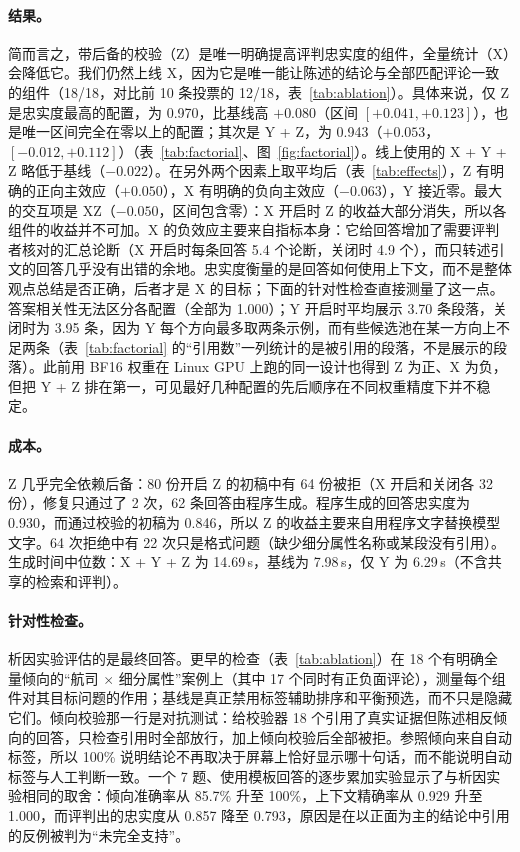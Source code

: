 \documentclass[10pt,twocolumn,a4paper]{article}
\begin{document}
\paragraph{结果。}简而言之，带后备的校验（Z）是唯一明确提高评判忠实度的组件，全量统计（X）会降低它。我们仍然上线 X，因为它是唯一能让陈述的结论与全部匹配评论一致的组件（18/18，对比前 10 条投票的 12/18，表~\ref{tab:ablation}）。具体来说，仅 Z 是忠实度最高的配置，为 0.970，比基线高 $+0.080$（区间 $[+0.041,+0.123]$），也是唯一区间完全在零以上的配置；其次是 Y + Z，为 0.943（$+0.053$，$[-0.012,+0.112]$）（表~\ref{tab:factorial}、图~\ref{fig:factorial}）。线上使用的 X + Y + Z 略低于基线（$-0.022$）。在另外两个因素上取平均后（表~\ref{tab:effects}），Z 有明确的正向主效应（$+0.050$），X 有明确的负向主效应（$-0.063$），Y 接近零。最大的交互项是 XZ（$-0.050$，区间包含零）：X 开启时 Z 的收益大部分消失，所以各组件的收益并不可加。X 的负效应主要来自指标本身：它给回答增加了需要评判者核对的汇总论断（X 开启时每条回答 5.4 个论断，关闭时 4.9 个），而只转述引文的回答几乎没有出错的余地。忠实度衡量的是回答如何使用上下文，而不是整体观点总结是否正确，后者才是 X 的目标；下面的针对性检查直接测量了这一点。答案相关性无法区分各配置（全部为 1.000）；Y 开启时平均展示 3.70 条段落，关闭时为 3.95 条，因为 Y 每个方向最多取两条示例，而有些候选池在某一方向上不足两条（表~\ref{tab:factorial} 的“引用数”一列统计的是被引用的段落，不是展示的段落）。此前用 BF16 权重在 Linux GPU 上跑的同一设计也得到 Z 为正、X 为负，但把 Y + Z 排在第一，可见最好几种配置的先后顺序在不同权重精度下并不稳定。

\paragraph{成本。}Z 几乎完全依赖后备：80 份开启 Z 的初稿中有 64 份被拒（X 开启和关闭各 32 份），修复只通过了 2 次，62 条回答由程序生成。程序生成的回答忠实度为 0.930，而通过校验的初稿为 0.846，所以 Z 的收益主要来自用程序文字替换模型文字。64 次拒绝中有 22 次只是格式问题（缺少细分属性名称或某段没有引用）。生成时间中位数：X + Y + Z 为 14.69\,s，基线为 7.98\,s，仅 Y 为 6.29\,s（不含共享的检索和评判）。

\paragraph{针对性检查。}析因实验评估的是最终回答。更早的检查（表~\ref{tab:ablation}）在 18 个有明确全量倾向的“航司 $\times$ 细分属性”案例上（其中 17 个同时有正负面评论），测量每个组件对其目标问题的作用；基线是真正禁用标签辅助排序和平衡预选，而不只是隐藏它们。倾向校验那一行是对抗测试：给校验器 18 个引用了真实证据但陈述相反倾向的回答，只检查引用时全部放行，加上倾向校验后全部被拒。参照倾向来自自动标签，所以 100\% 说明结论不再取决于屏幕上恰好显示哪十句话，而不能说明自动标签与人工判断一致。一个 7 题、使用模板回答的逐步累加实验显示了与析因实验相同的取舍：倾向准确率从 85.7\% 升至 100\%，上下文精确率从 0.929 升至 1.000，而评判出的忠实度从 0.857 降至 0.793，原因是在以正面为主的结论中引用的反例被判为“未完全支持”。
\end{document}
